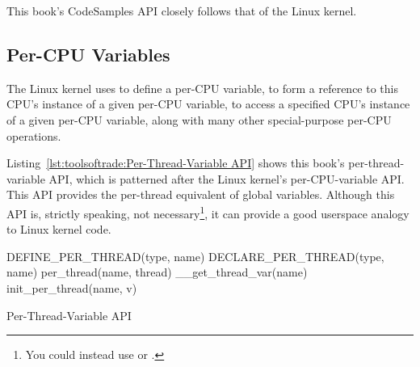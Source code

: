 This book's CodeSamples API closely follows that of the Linux kernel.

\subsection{Per-CPU Variables}
\label{sec:toolsoftrade:Per-CPU Variables}

The Linux kernel uses  to define a per-CPU variable,
 to form a reference to this CPU's instance of a
given per-CPU variable,  to access a specified CPU's
instance of a given per-CPU variable, along with many other special-purpose
per-CPU operations.

Listing~\ref{lst:toolsoftrade:Per-Thread-Variable API}
shows this book's per-thread-variable API, which is patterned
after the Linux kernel's per-CPU-variable API\@.
This API provides the per-thread equivalent of global variables.
Although this API is, strictly speaking, not necessary\footnote{
	You could instead use  or .},
it can provide a good userspace analogy to Linux kernel code.

\begin{listing}[tbp]
\begin{VerbatimL}[numbers=none]
DEFINE_PER_THREAD(type, name)
DECLARE_PER_THREAD(type, name)
per_thread(name, thread)
__get_thread_var(name)
init_per_thread(name, v)
\end{VerbatimL}
\caption{Per-Thread-Variable API}
\label{lst:toolsoftrade:Per-Thread-Variable API}
\end{listing}

\QuickQuizEnd


